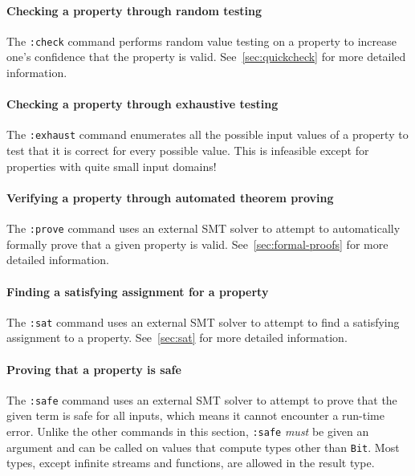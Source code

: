 \paragraph*{Checking a property through random testing}
The \texttt{:check} command performs random value testing on a
property to increase one's confidence that the property is valid.
See~\autoref{sec:quickcheck} for more detailed information.

\paragraph*{Checking a property through exhaustive testing}
The \texttt{:exhaust} command enumerates all the possible input values
of a property to test that it is correct for every possible value.
This is infeasible except for properties with quite small input
domains!

\paragraph*{Verifying a property through automated theorem proving}
The \texttt{:prove} command uses an external SMT solver to attempt to
automatically formally prove that a given property is valid.
See~\autoref{sec:formal-proofs} for more detailed information.

\paragraph*{Finding a satisfying assignment for a property}
The \texttt{:sat} command uses an external SMT solver to attempt to
find a satisfying assignment to a property.  See~\autoref{sec:sat} for
more detailed information.

\paragraph*{Proving that a property is safe}
The \texttt{:safe} command uses an external SMT solver to attempt to
prove that the given term is safe for all inputs, which means it cannot
encounter a run-time error.  Unlike the other commands in this section,
\texttt{:safe} \emph{must} be given an argument and can be called on
values that compute types other than \texttt{Bit}.  Most types, except
infinite streams and functions, are allowed in the result type.




